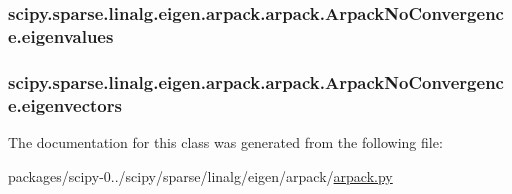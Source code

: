 \subsubsection[{eigenvalues}]{\setlength{\rightskip}{0pt plus 5cm}scipy.\+sparse.\+linalg.\+eigen.\+arpack.\+arpack.\+Arpack\+No\+Convergence.\+eigenvalues}\label{classscipy_1_1sparse_1_1linalg_1_1eigen_1_1arpack_1_1arpack_1_1ArpackNoConvergence_a0a63a559f1f44c299e18808434917a84}
\hypertarget{classscipy_1_1sparse_1_1linalg_1_1eigen_1_1arpack_1_1arpack_1_1ArpackNoConvergence_a61dc4b4d534293bca4cecc25149c9ad3}{}
\subsubsection[{eigenvectors}]{\setlength{\rightskip}{0pt plus 5cm}scipy.\+sparse.\+linalg.\+eigen.\+arpack.\+arpack.\+Arpack\+No\+Convergence.\+eigenvectors}\label{classscipy_1_1sparse_1_1linalg_1_1eigen_1_1arpack_1_1arpack_1_1ArpackNoConvergence_a61dc4b4d534293bca4cecc25149c9ad3}


The documentation for this class was generated from the following file\+:\begin{DoxyCompactItemize}
\item 
packages/scipy-\/0../scipy/sparse/linalg/eigen/arpack/\hyperlink{arpack_8py}{arpack.\+py}\end{DoxyCompactItemize}
